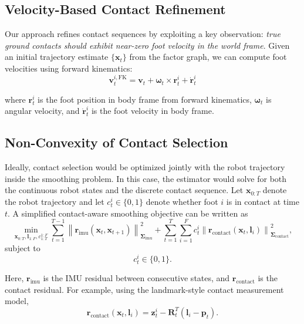 \documentclass[conference]{IEEEtran}
\begin{document}
\subsection{Velocity-Based Contact Refinement}
Our approach refines contact sequences by exploiting a key observation: \textit{true ground contacts should exhibit near-zero foot velocity in the world frame}. Given an initial trajectory estimate $\{\mathbf{x}_t\}$ from the factor graph, we can compute foot velocities using forward kinematics:
\begin{equation}
\mathbf{v}_t^{i,\text{FK}} = \mathbf{v}_t + \boldsymbol{\omega}_t \times \mathbf{r}_t^i + \dot{\mathbf{r}}_t^i
\end{equation}

where $\mathbf{r}_t^i$ is the foot position in body frame from forward kinematics, $\boldsymbol{\omega}_t$ is angular velocity, and $\dot{\mathbf{r}}_t^i$ is the foot velocity in body frame.
\subsection{Non-Convexity of Contact Selection}

Ideally, contact selection would be optimized jointly with the robot trajectory inside the smoothing
problem. In this case, the estimator would solve for both the continuous robot states and the discrete
contact sequence. Let $\mathbf{x}_{0:T}$ denote the robot trajectory and let $c_t^i \in \{0,1\}$ denote
whether foot $i$ is in contact at time $t$. A simplified contact-aware smoothing objective can be written as
\begin{equation}
\min_{\mathbf{x}_{0:T}, \mathbf{l}_{1:F}, c_{1:T}^{1:F}}
\sum_{t=1}^{T-1}
\left\|
\mathbf{r}_{\text{imu}}(\mathbf{x}_t,\mathbf{x}_{t+1})
\right\|_{\boldsymbol{\Sigma}_{\text{imu}}}^{2}
+
\sum_{t=1}^{T}\sum_{i=1}^{F}
c_t^i
\left\|
\mathbf{r}_{\text{contact}}(\mathbf{x}_t,\mathbf{l}_i)
\right\|_{\boldsymbol{\Sigma}_{\text{contact}}}^{2}
,
\label{eq:joint_contact_smoothing}
\end{equation}
subject to
\begin{equation}
c_t^i \in \{0,1\}.
\end{equation}

Here, $\mathbf{r}_{\text{imu}}$ is the IMU residual between consecutive states, and
$\mathbf{r}_{\text{contact}}$ is the contact residual. For example, using the landmark-style contact
measurement model,
\begin{equation}
\mathbf{r}_{\text{contact}}(\mathbf{x}_t,\mathbf{l}_i)
=
\mathbf{z}_t^i
-
\mathbf{R}_t^T(\mathbf{l}_i-\mathbf{p}_t).
\end{equation}
\end{document}
